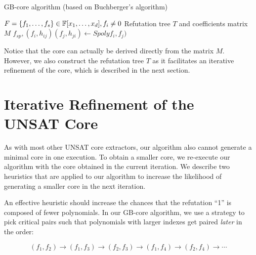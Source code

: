 \begin{algorithm}[H]
 \caption{GB-core algorithm (based on Buchberger's algorithm)}
 \label{algo:gbcore}
 \begin{algorithmic}[1]

 \REQUIRE $F = \{f_1, \dots, f_s\} \in {\mathbb{F}}[x_1, \dots, x_d], f_i\neq 0$
 \ENSURE Refutation tree $T$ and coefficients matrix $M$
 	\STATE  $f_{sp},(f_{i},h_{ij})(f_{j},h_{ji}) \gets Spolyf_i,f_j)$ 
 	\ENDIF
 	\ENDIF
 \ENDFOR
 \end{algorithmic}
 \end{algorithm}


Notice that the core can actually be derived directly from the matrix 
$M$. However, we also construct the refutation tree $T$ as it
facilitates an iterative refinement of the core, which is described
in the next section. 

\section{Iterative Refinement of the UNSAT Core}
\label{sec:iter}

As with most other UNSAT core extractors, our algorithm also cannot
generate a minimal core in one execution. To obtain a smaller core, we
 re-execute our algorithm with the core obtained in the current
iteration. We describe two heuristics that are applied to our
algorithm to increase the likelihood of generating a smaller core in
the next iteration.  

An effective heuristic should increase the chances that the refutation
``1'' is composed of fewer polynomials.  In our GB-core algorithm, we
use a strategy to pick critical pairs such that polynomials with
larger indexes get paired {\it later} in the order:

$$(f_1,f_2)\to(f_1,f_3)\to(f_2,f_3)\to(f_1,f_4)\to(f_2,f_4)\to\cdots$$


